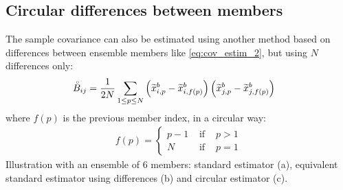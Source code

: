 \documentclass[12pt]{scrartcl}
\begin{document}
\subsection{Circular differences between members}
The sample covariance can also be estimated using another method based on differences between ensemble members like \eqref{eq:cov_estim_2}, but using $N$ differences only:
\begin{align}
\label{eq:cov_estim_3}
\accentset{\circ}{B}_{ij} & = \frac{1}{2N} \sum_{1 \le p \le N} \left(\widetilde{x}^b_{i,p} - \widetilde{x}^b_{i,f(p)}\right) \left(\widetilde{x}^b_{j,p} - \widetilde{x}^b_{j,f(p)}\right)
\end{align}
where $f(p)$ is the previous member index, in a circular way:
\begin{align}
f(p) = \left\{ \begin{array}{rcl}
p-1 & \text{ if } & p > 1 \\
N & \text{ if } & p = 1
\end{array}\right.
\end{align}
Illustration with an ensemble of 6 members: standard estimator (a), equivalent standard estimator using differences (b) and circular estimator (c).
\end{document}
